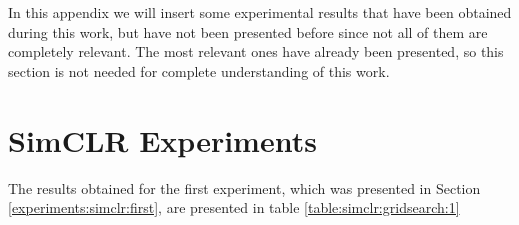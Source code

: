 
\label{APPENDIX:B}
In this appendix we will insert some experimental results that have been obtained during this work, but have not been presented before since not all of them are completely relevant.
The most relevant ones have already been presented, so this section is not needed for complete understanding of this work.
\section{SimCLR Experiments}

The results obtained for the first experiment, which was presented in Section \ref{experiments:simclr:first}, are presented in table \ref{table:simclr:gridsearch:1}

\begin{table}[H]
\centering


\end{table}
